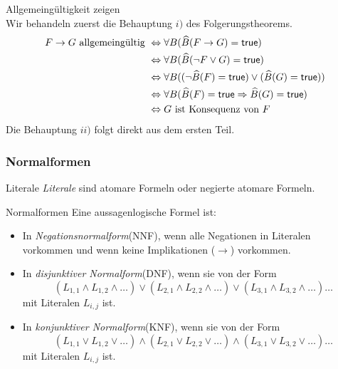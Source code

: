 \begin{howto}{Allgemeingültigkeit zeigen}\\
    Wir behandeln zuerst die Behauptung $i)$ des Folgerungstheorems.
    \begin{align*}
    F\to G\text{ allgemeingültig } &\Leftrightarrow \forall B(\widehat{B}(F\to G) =\mathsf{true})\\
    &\Leftrightarrow \forall B(\widehat{B}(\neg F\lor G) =\mathsf{true})\\
    &\Leftrightarrow \forall B((\neg \widehat{B}(F)=\mathsf{true}) \lor (\widehat{B}(G) =\mathsf{true}))\\
    &\Leftrightarrow \forall B(\widehat{B}(F)=\mathsf{true}\Rightarrow \widehat{B}(G)=\mathsf{true})\\
    &\Leftrightarrow G\text{ ist Konsequenz von }F
    \end{align*}
    Die Behauptung $ii)$ folgt direkt aus dem ersten Teil.
\end{howto}




\subsubsection*{Normalformen}
\begin{comment}
\begin{remark}
Ausdrücke von der Form $F_1\lor\dots\lor F_n$ oder $F_1\land\dots\land F_n$ stehen stellvertretend für alle möglichen Formeln die durch Klammersetzung aus ihnen gebildet werden können. Für den Wahrheitswert der Formeln ist die genaue Klammerung, wegen der Assoziativität unwichtig.
\end{remark}
\end{comment}

\begin{definition}{Literale}
\textit{Literale} sind atomare Formeln oder negierte atomare Formeln.
\end{definition}

\begin{concept}{Normalformen}
Eine aussagenlogische Formel ist:
\begin{itemize}
\item In \textit{Negationsnormalform}(NNF), wenn alle Negationen in Literalen vorkommen und wenn keine Implikationen ($\to$) vorkommen.
\item In \textit{disjunktiver Normalform}(DNF), wenn sie von der Form
\[
(L_{1,1}\land L_{1,2}\land\dots)\lor(L_{2,1}\land L_{2,2}\land\dots)\lor(L_{3,1}\land L_{3,2}\land\dots)\dots
\]
mit Literalen $L_{i,j}$ ist.
\item In \textit{konjunktiver Normalform}(KNF), wenn sie von der Form
\[
(L_{1,1}\lor L_{1,2}\lor\dots)\land(L_{2,1}\lor L_{2,2}\lor\dots)\land(L_{3,1}\lor L_{3,2}\lor\dots)\dots
\]
mit Literalen $L_{i,j}$ ist.
\end{itemize}
\end{concept}

